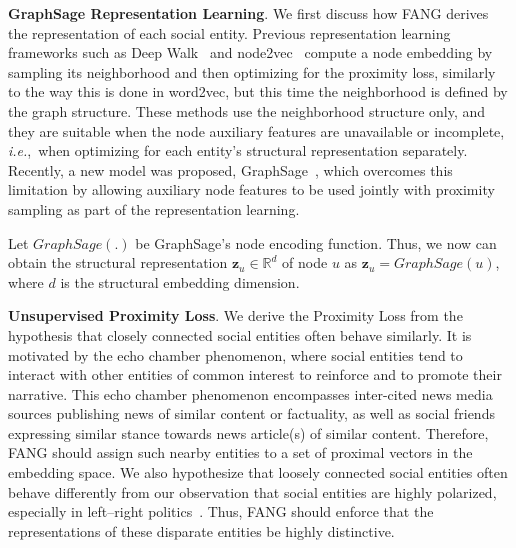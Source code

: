 \documentclass[sigconf,anonymous]{acmart}
\theoremstyle{definition}
\theoremstyle{hypothesis}
\begin{document}
\textbf{GraphSage Representation Learning}. We first discuss how FANG derives the representation of each social entity. Previous representation learning frameworks such as Deep Walk~\cite{perozzi2014deepwalk} and node2vec~\cite{grover2016node2vec} compute a node embedding by sampling its neighborhood and then optimizing for the proximity loss, similarly to the way this is done in word2vec, but this time the neighborhood is defined by the graph structure. These methods use the neighborhood structure only, and they are suitable when the node auxiliary features are unavailable or incomplete, \emph{i.e.},~when optimizing for each entity's structural representation separately. Recently, a new model was proposed, GraphSage~\cite{Hamilton2017InductiveRL}, which overcomes this limitation by allowing auxiliary node features to be used jointly with proximity sampling as part of the representation learning. 

Let $GraphSage(.)$ be GraphSage's node encoding function. Thus, we now can obtain the structural representation $\boldsymbol{z}_u\in \mathbb{R}^d$ of node $u$ as $\boldsymbol{z}_u=GraphSage(u)$, where $d$ is the structural embedding dimension.

\textbf{Unsupervised Proximity Loss}. We derive the Proximity Loss from the hypothesis that closely connected social entities often behave similarly. It is motivated by the echo chamber phenomenon, where social entities tend to interact with other entities of common interest to reinforce and to promote their narrative. This echo chamber phenomenon encompasses inter-cited news media sources publishing news of similar content or factuality, as well as social friends expressing similar stance towards news article(s) of similar content. Therefore, FANG should assign such nearby entities to a set of
proximal vectors
in the embedding space. We also hypothesize that loosely connected social entities often behave differently from our observation that social entities are highly polarized, especially in left--right politics~\cite{boxell2017internet}. Thus, FANG should enforce that the representations of these disparate entities be highly distinctive.
\end{document}
